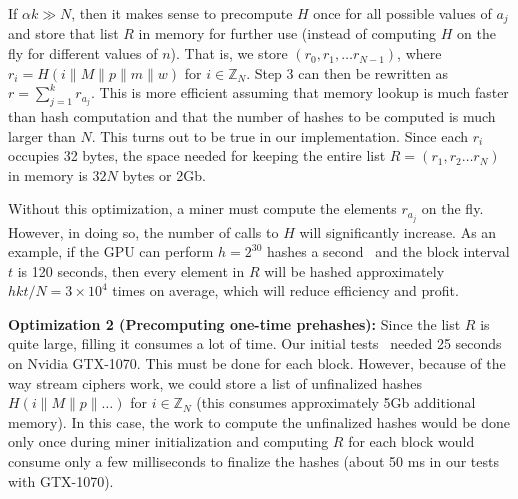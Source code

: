 \documentclass[11pt]{article}
\begin{document}
If $\alpha k \gg N$, then it makes sense to precompute $H$ once for all possible values of $a_j$ and store that list $R$ in memory for further use (instead of computing $H$ on the fly for different values of $n$). That is, we store $(r_0, r_1, \ldots r_{N-1})$, where $r_i = H(i\|M\|{p}\|m\|w)$ for $i\in \mathbb{Z}_N$. Step 3 can then be rewritten as $r = \sum^{k}_{j=1}r_{a_j}$. This is more efficient assuming that memory lookup is much faster than hash computation and that the number of hashes to be computed is much larger than $N$. 
This turns out to be true in our implementation.
Since each $r_i$ occupies 32 bytes, the space needed for keeping the entire list $R = (r_1, r_2\ldots r_N)$ in memory is $32N$ bytes or 2Gb. 

Without this optimization, a miner must compute the elements $r_{a_j}$ on the fly. However, in doing so, the number of calls to $H$ will significantly increase. As an example, if the GPU can perform $h = 2^{30}$ hashes a second~\cite{ref} and the block interval $t$ is 120 seconds, then every element in $R$ will be hashed approximately $hkt/N = 3\times 10^4$ times on average, which will reduce efficiency and profit.

\textbf{Optimization 2 (Precomputing one-time prehashes):} Since the list $R$ is quite large, filling it consumes a lot of time. Our initial tests~\cite{impl} needed 25 seconds on Nvidia GTX-1070.
This must be done for each block. However, because of the way stream ciphers work, we could store a list of unfinalized hashes 
$H(i\|M\|{p}\|\ldots)$ for $i\in \mathbb{Z}_N$ (this consumes approximately 5Gb additional memory).
In this case, the work to compute the unfinalized hashes would be done only once during miner initialization and computing $R$ for each block would consume only a few milliseconds to finalize the hashes (about 50 ms in our tests with GTX-1070).
\end{document}

